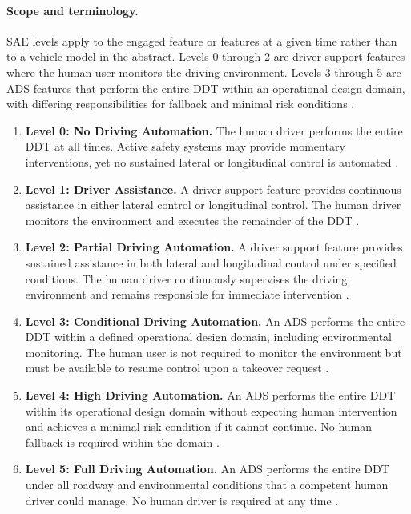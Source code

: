\paragraph{Scope and terminology.}
SAE levels apply to the engaged feature or features at a given time rather than to a vehicle model in the abstract. Levels 0 through 2 are driver support features where the human user monitors the driving environment. Levels 3 through 5 are ADS features that perform the entire DDT within an operational design domain, with differing responsibilities for fallback and minimal risk conditions \cite{SAEJ3016_2021}.

\begin{enumerate}
    \item \textbf{Level 0: No Driving Automation.}
    The human driver performs the entire DDT at all times. Active safety systems may provide momentary interventions, yet no sustained lateral or longitudinal control is automated \cite{SAEJ3016_2021}.

    \item \textbf{Level 1: Driver Assistance.}
    A driver support feature provides continuous assistance in either lateral control or longitudinal control. The human driver monitors the environment and executes the remainder of the DDT \cite{SAEJ3016_2021}.

    \item \textbf{Level 2: Partial Driving Automation.}
    A driver support feature provides sustained assistance in both lateral and longitudinal control under specified conditions. The human driver continuously supervises the driving environment and remains responsible for immediate intervention \cite{SAEJ3016_2021}.

    \item \textbf{Level 3: Conditional Driving Automation.}
    An ADS performs the entire DDT within a defined operational design domain, including environmental monitoring. The human user is not required to monitor the environment but must be available to resume control upon a takeover request \cite{SAEJ3016_2021}.

    \item \textbf{Level 4: High Driving Automation.}
    An ADS performs the entire DDT within its operational design domain without expecting human intervention and achieves a minimal risk condition if it cannot continue. No human fallback is required within the domain \cite{SAEJ3016_2021}.

    \item \textbf{Level 5: Full Driving Automation.}
    An ADS performs the entire DDT under all roadway and environmental conditions that a competent human driver could manage. No human driver is required at any time \cite{SAEJ3016_2021}.
\end{enumerate}

